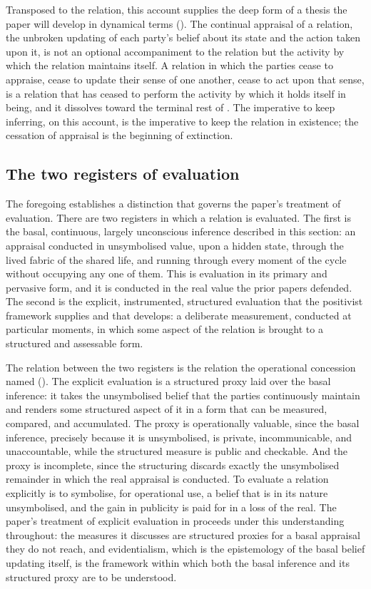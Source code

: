 Transposed to the relation, this account supplies the deep form of a thesis the paper will develop in dynamical terms (). The continual appraisal of a relation, the unbroken updating of each party's belief about its state and the action taken upon it, is not an optional accompaniment to the relation but the activity by which the relation maintains itself. A relation in which the parties cease to appraise, cease to update their sense of one another, cease to act upon that sense, is a relation that has ceased to perform the activity by which it holds itself in being, and it dissolves toward the terminal rest of . The imperative to keep inferring, on this account, is the imperative to keep the relation in existence; the cessation of appraisal is the beginning of extinction.

\subsection{The two registers of evaluation}
\label{p11:sec:ap-two}

The foregoing establishes a distinction that governs the paper's treatment of evaluation. There are two registers in which a relation is evaluated. The first is the basal, continuous, largely unconscious inference described in this section: an appraisal conducted in unsymbolised value, upon a hidden state, through the lived fabric of the shared life, and running through every moment of the cycle without occupying any one of them. This is evaluation in its primary and pervasive form, and it is conducted in the real value the prior papers defended. The second is the explicit, instrumented, structured evaluation that the positivist framework supplies and that  develops: a deliberate measurement, conducted at particular moments, in which some aspect of the relation is brought to a structured and assessable form.

The relation between the two registers is the relation the operational concession named (). The explicit evaluation is a structured proxy laid over the basal inference: it takes the unsymbolised belief that the parties continuously maintain and renders some structured aspect of it in a form that can be measured, compared, and accumulated. The proxy is operationally valuable, since the basal inference, precisely because it is unsymbolised, is private, incommunicable, and unaccountable, while the structured measure is public and checkable. And the proxy is incomplete, since the structuring discards exactly the unsymbolised remainder in which the real appraisal is conducted. To evaluate a relation explicitly is to symbolise, for operational use, a belief that is in its nature unsymbolised, and the gain in publicity is paid for in a loss of the real. The paper's treatment of explicit evaluation in  proceeds under this understanding throughout: the measures it discusses are structured proxies for a basal appraisal they do not reach, and evidentialism, which is the epistemology of the basal belief updating itself, is the framework within which both the basal inference and its structured proxy are to be understood.
